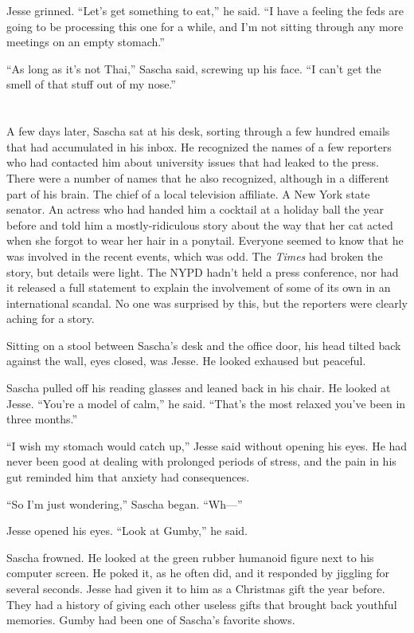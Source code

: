 \documentclass[12pt]{book}
\begin{document}
Jesse grinned.  ``Let's get something to eat,'' he said.  ``I have a feeling the feds are going to be processing this one for a while, and I'm not sitting through any more meetings on an empty stomach.''

``As long as it's not Thai,'' Sascha said, screwing up his face.  ``I can't get the smell of that stuff out of my nose.''

\chapter{}

A few days later, Sascha sat at his desk, sorting through a few hundred emails that had accumulated in his inbox.  He recognized the names of a few reporters who had contacted him about university issues that had leaked to the press.  There were a number of names that he also recognized, although in a different part of his brain.  The chief of a local television affiliate.  A New York state senator.  An actress who had handed him a cocktail at a holiday ball the year before and told him a mostly-ridiculous story about the way that her cat acted when she forgot to wear her hair in a ponytail.  Everyone seemed to know that he was involved in the recent events, which was odd.  The \emph{Times} had broken the story, but details were light.  The NYPD hadn't held a press conference, nor had it released a full statement to explain the involvement of some of its own in an international scandal.  No one was surprised by this, but the reporters were clearly aching for a story.

Sitting on a stool between Sascha's desk and the office door, his head tilted back against the wall, eyes closed, was Jesse.  He looked exhaused but peaceful.

Sascha pulled off his reading glasses and leaned back in his chair.  He looked at Jesse.  ``You're a model of calm,'' he said.  ``That's the most relaxed you've been in three months.''

``I wish my stomach would catch up,'' Jesse said without opening his eyes.  He had never been good at dealing with prolonged periods of stress, and the pain in his gut reminded him that anxiety had consequences.

``So I'm just wondering,'' Sascha began.  ``Wh---''

Jesse opened his eyes.  ``Look at Gumby,'' he said.

Sascha frowned.  He looked at the green rubber humanoid figure next to his computer screen.  He poked it, as he often did, and it responded by jiggling for several seconds.  Jesse had given it to him as a Christmas gift the year before.  They had a history of giving each other useless gifts that brought back youthful memories.  Gumby had been one of Sascha's favorite shows.
\end{document}
